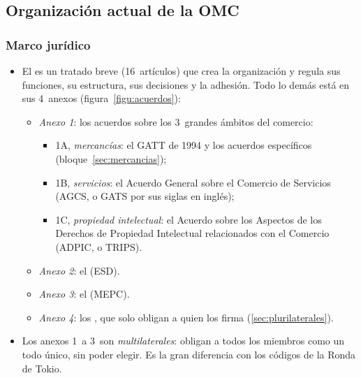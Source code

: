 \documentclass[11pt]{article}
\begin{document}
\subsection{Organización actual de la OMC}\label{sec:organizacion}

\subsubsection{Marco jurídico}\label{sec:juridico}

\begin{itemize}
\item El  es un tratado breve (16~artículos) que crea la organización y regula sus funciones, su estructura, sus decisiones y la adhesión. Todo lo demás está en sus 4~anexos (figura~\ref{figu:acuerdos}):
  \begin{itemize}
  \item \emph{Anexo 1}: los acuerdos sobre los 3~grandes ámbitos del comercio:
    \begin{itemize}
    \item 1A, \emph{mercancías}: el GATT de 1994 y los acuerdos específicos (bloque~\ref{sec:mercancias});
    \item 1B, \emph{servicios}: el Acuerdo General sobre el Comercio de Servicios (AGCS, o GATS por sus siglas en inglés);
    \item 1C, \emph{propiedad intelectual}: el Acuerdo sobre los Aspectos de los Derechos de Propiedad Intelectual relacionados con el Comercio (ADPIC, o TRIPS).
    \end{itemize}
  \item \emph{Anexo 2}: el  (ESD).
  \item \emph{Anexo 3}: el  (MEPC).
  \item \emph{Anexo 4}: los , que solo obligan a quien los firma (\ref{sec:plurilaterales}).
  \end{itemize}
\item Los anexos 1~a 3~son \emph{multilaterales}: obligan a todos los miembros como un todo único, sin poder elegir. Es la gran diferencia con los códigos de la Ronda de Tokio.
\end{itemize}

\begin{infografia}[H]
\centering
\caption{Los acuerdos de la OMC: el Acuerdo de Marrakech y sus anexos}\label{figu:acuerdos}
\end{infografia}
\end{document}
